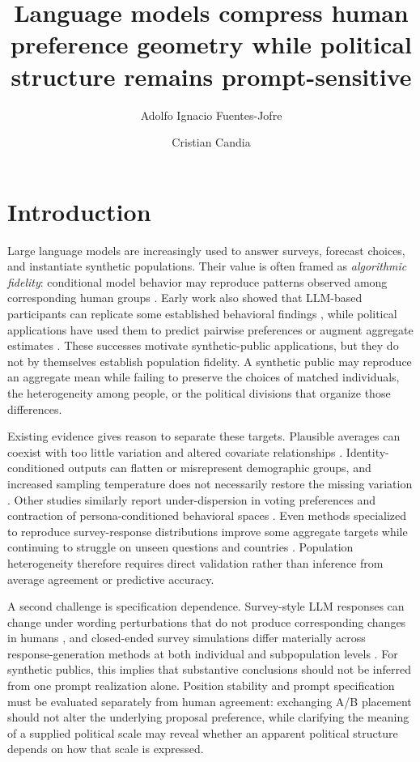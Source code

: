 \documentclass[unnumsec,webpdf,modern,large]{oup-authoring-template}
\title[Compressed preference geometry in synthetic publics]{Language models compress human preference geometry while political structure remains prompt-sensitive}
\author[1,2,$\ast$]{Adolfo Ignacio Fuentes-Jofre}
\author[1,2,3,$\ast$]{Cristian Candia}
\begin{document}
\maketitle

\section{Introduction}

Large language models are increasingly used to answer surveys, forecast choices, and instantiate synthetic populations. Their value is often framed as \emph{algorithmic fidelity}: conditional model behavior may reproduce patterns observed among corresponding human groups \citep{Argyle2023}. Early work also showed that LLM-based participants can replicate some established behavioral findings \citep{Aher2023}, while political applications have used them to predict pairwise preferences or augment aggregate estimates \citep{GudinoRosero2024}. These successes motivate synthetic-public applications, but they do not by themselves establish population fidelity. A synthetic public may reproduce an aggregate mean while failing to preserve the choices of matched individuals, the heterogeneity among people, or the political divisions that organize those differences.

Existing evidence gives reason to separate these targets. Plausible averages can coexist with too little variation and altered covariate relationships \citep{Bisbee2024}. Identity-conditioned outputs can flatten or misrepresent demographic groups, and increased sampling temperature does not necessarily restore the missing variation \citep{Wang2025}. Other studies similarly report under-dispersion in voting preferences and contraction of persona-conditioned behavioral spaces \citep{Ball2025,Xiao2026,Bhattacharyya2026}. Even methods specialized to reproduce survey-response distributions improve some aggregate targets while continuing to struggle on unseen questions and countries \citep{Cao2025}. Population heterogeneity therefore requires direct validation rather than inference from average agreement or predictive accuracy.

A second challenge is specification dependence. Survey-style LLM responses can change under wording perturbations that do not produce corresponding changes in humans \citep{Tjuatja2024}, and closed-ended survey simulations differ materially across response-generation methods at both individual and subpopulation levels \citep{Ahnert2026}. For synthetic publics, this implies that substantive conclusions should not be inferred from one prompt realization alone. Position stability and prompt specification must be evaluated separately from human agreement: exchanging A/B placement should not alter the underlying proposal preference, while clarifying the meaning of a supplied political scale may reveal whether an apparent political structure depends on how that scale is expressed.
\end{document}
